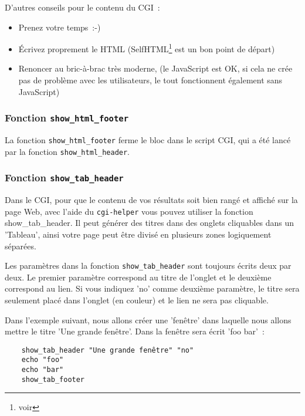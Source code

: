 D'autres conseils pour le contenu du CGI~:

\begin{itemize}
 \item Prenez votre temps~:-)
 \item Écrivez proprement le HTML (SelfHTML\footnote{voir
    } est un bon point de départ)
 \item Renoncer au bric-à-brac très moderne, (le JavaScript est OK, si cela ne crée pas
    de problème avec les utilisateurs, le tout fonctionnent également sans JavaScript)
\end{itemize}


\subsubsection{Fonction \texttt{show\_html\_footer}}

La fonction \texttt{show\_html\_footer} ferme le bloc dans le script CGI, qui a été lancé par
la fonction \texttt{show\_html\_header}.


\subsubsection{Fonction \texttt{show\_tab\_header}}

Dans le CGI, pour que le contenu de vos résultats soit bien rangé et affiché
sur la page Web, avec l'aide du \texttt{cgi-helper} vous pouvez utiliser la fonction
show\_tab\_header. Il peut générer des titres dans des onglets cliquables dans
un 'Tableau', ainsi votre page peut être divisé en plusieurs zones logiquement séparées.

Les paramètres dans la fonction \texttt{show\_tab\_header} sont toujours écrits deux par
deux. Le premier paramètre correspond au titre de l’onglet et le deuxième
correspond au lien. Si vous indiquez 'no' comme deuxième paramètre, le titre
sera seulement placé dans l'onglet (en couleur) et le lien ne sera pas cliquable.

Dans l'exemple suivant, nous allons créer une 'fenêtre' dans laquelle nous
allons mettre le titre 'Une grande fenêtre’. Dans la fenêtre sera écrit 'foo bar'~:

\begin{example}
\begin{verbatim}
    show_tab_header "Une grande fenêtre" "no"
    echo "foo"
    echo "bar"
    show_tab_footer
\end{verbatim}
\end{example}


